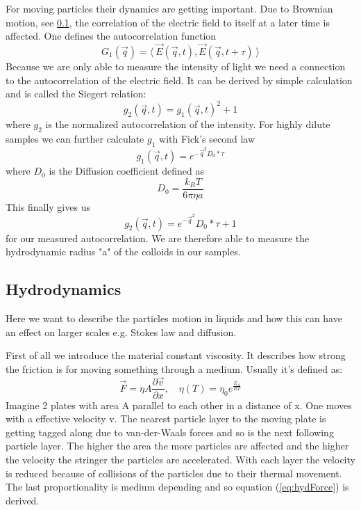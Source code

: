 \documentclass[]{article}
\begin{document}
For moving particles their dynamics are getting important. Due to Brownian motion, see \ref{hyd}, the correlation of the electric field to itself at a later time is affected. One defines the autocorrelation function 
\begin{equation}\label{eq:g1}
G_1(\vec{q}) = \langle \: \vec{E}(\vec{q},t),\vec{E}(\vec{q},t+\tau) \: \rangle
\end{equation} 
Because we are only able to measure the intensity of light we need a connection to the autocorrelation of the electric field. It can be derived by simple calculation and is called the Siegert relation:
\begin{equation}\label{eq:siegert}
g_2(\vec{q},t) = g_1(\vec{q},t )^2 +1
\end{equation}
where $g_2$ is the normalized autocorrelation of the intensity. For highly dilute samples we can further calculate $g_1$ with Fick's second law
\begin{equation}\label{eq:g1solved}
g_1(\vec{q},t )=e^{-\vec{q}^{2}D_0*\tau}
\end{equation}
where $D_0$ is the Diffusion coefficient defined as 
\begin{equation}\label{eq:StokesEinstein}
D_0=\frac{k_BT}{6\pi \eta a}
\end{equation}
This finally gives us 
\begin{equation}\label{eq:g2}
\boxed{g_2(\vec{q},t) =e^{- \vec{q}^{2}}D_0*\tau+1}
\end{equation}
for our measured autocorrelation. We are therefore able to measure the hydrodynamic radius "a" of the colloids in our samples.


\subsection{Hydrodynamics}
\label{hyd}
Here we want to describe the particles motion in liquids and how this can have an effect on larger scales e.g. Stokes law and diffusion.

First of all we introduce the material constant viscosity. It describes how strong the friction is for moving something through a medium. Usually it's defined as: 
\begin{equation}\label{eq:hydForce}
\vec{F}=\eta A \frac{\partial \vec{v}}{\partial x} , \quad \eta(T)= \eta_0 e^{\frac{E_A}{RT}}
\end{equation}
Imagine 2 plates with area A parallel to each other in a distance of x. One moves with a effective velocity v. The nearest particle layer  to the moving plate is getting tagged along due to van-der-Waals forces and so is the next following particle layer. The higher the area the more particles are affected and the higher the velocity the stringer the particles are accelerated. With each layer the velocity is reduced because of collisions of the particles due to their thermal movement. The last proportionality is medium depending and so equation (\ref{eq:hydForce}) is derived.
\end{document}
